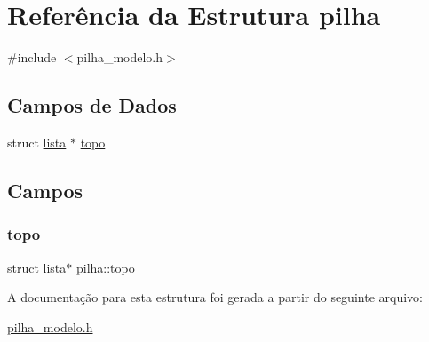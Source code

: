 \hypertarget{structpilha}{}\section{Referência da Estrutura pilha}
\label{structpilha}


{\ttfamily \#include $<$pilha\+\_\+modelo.\+h$>$}

\subsection*{Campos de Dados}
\begin{DoxyCompactItemize}
\item 
struct \hyperlink{structlista}{lista} $\ast$ \hyperlink{structpilha_af710a80cc659420807a4e273fba075a1}{topo}
\end{DoxyCompactItemize}


\subsection{Campos}
\mbox{\label{structpilha_af710a80cc659420807a4e273fba075a1}} 
\subsubsection{\texorpdfstring{topo}{topo}}
{\footnotesize\ttfamily struct \hyperlink{structlista}{lista}$\ast$ pilha\+::topo}



A documentação para esta estrutura foi gerada a partir do seguinte arquivo\+:\begin{DoxyCompactItemize}
\item 
\hyperlink{pilha__modelo_8h}{pilha\+\_\+modelo.\+h}\end{DoxyCompactItemize}
